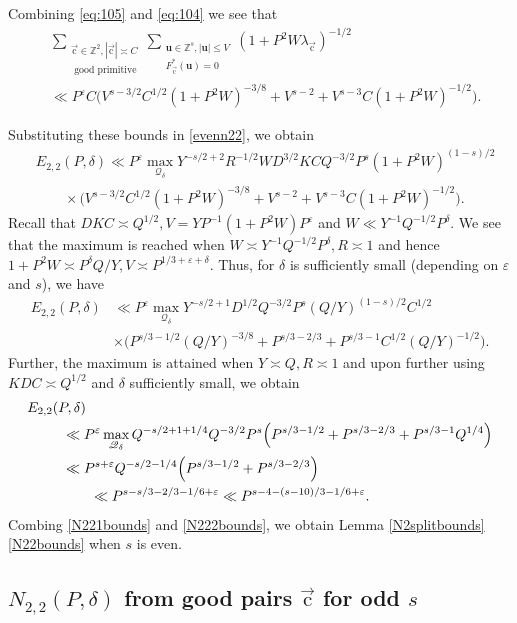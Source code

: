 \documentclass[letterpaper,11pt]{amsart}
\numberwithin{equation}{section}
\theoremstyle{definition}
\numberwithin{equation}{section}
\newcommand{\Z}{\mathbb{Z}}
\newcommand{\ZZ}{\mathbb{Z}}
\newcommand{\uu}{\mathbf{u}}
\newcommand{\uc}{{\vec{\mathrm{c}}}}
\newcommand{\ve}{\varepsilon}
\begin{document}
Combining \eqref{eq:105} and \eqref{eq:104} we see that 
\begin{align*}%
&\sum_{\substack{ \uc\in\ZZ^2, |\uc| \asymp C\\ \textrm{ good primitive}}}			 \sum_{\substack{\uu\in \Z^s, |\uu|\leq V\\ F_\uc^*(\uu)= 0}}(1+P^2W\lambda_\uc)^{-1/2}\\&\ll P^{\ve}C \Big(V^{s-3/2}C^{1/2}(1+P^2W)^{-3/8}+V^{s-2}+V^{s-3}C(1+P^2W)^{-1/2}\Big).
\end{align*}

Substituting these bounds in \eqref{evenn22}, we obtain 
\begin{align*}
&E_{2,2}(P, \delta)\ll P^{\ve}\max_{\mathcal Q_\delta} Y^{-s/2+2}R^{-1/2}WD^{3/2}KCQ^{-3/2}P^{s}(1+P^2W)^{(1-s)/2}\\
&\quad \quad \times \Big(V^{s-3/2}C^{1/2}(1+P^2W)^{-3/8}+V^{s-2}+V^{s-3}C(1+P^2W)^{-1/2}\Big).
\end{align*}
Recall that $DKC\asymp Q^{1/2}, V=YP^{-1} (1+P^2W)P^\ve$ and $W\ll Y^{-1}Q^{-1/2}P^\delta$.  We see that the maximum is reached when $W\asymp Y^{-1}Q^{-1/2}P^\delta, R\asymp 1$ and hence $1+P^2W\asymp P^\delta Q/Y, V\asymp P^{1/3+\ve+\delta}$. Thus, for $\delta$ is sufficiently small (depending on $\ve$ and $s$), we have
\begin{align*}
     E_{2,2}(P, \delta)&\ll P^{\ve}\max_{\mathcal Q_\delta} Y^{-s/2+1}D^{1/2}Q^{-3/2}P^{s}(Q/Y)^{(1-s)/2}C^{1/2}\\
&\times \Big(P^{s/3-1/2}(Q/Y)^{-3/8}+P^{s/3-2/3}+P^{s/3-1}C^{1/2}(Q/Y)^{-1/2}\Big).
\end{align*}
 Further, the maximum is attained when $Y\asymp Q, R\asymp 1$
and upon further using $KDC\asymp Q^{1/2}$ and $\delta$ sufficiently small, we obtain
\begin{align}\nonumber
\MoveEqLeft[2.5] E_{2,2}(P, \delta)\\
\nonumber
&\ll P^\ve\max_{\mathcal Q_\delta} Q^{-s/2+1+1/4}Q^{-3/2}P^{s}
\Big(P^{s/3-1/2}+P^{s/3-2/3}+P^{s/3-1}Q^{1/4}\Big)\\
\nonumber
&\ll
P^{s+\ve} Q^{-s/2-1/4}\Big(P^{s/3-1/2}+P^{s/3-2/3}\Big)
\\
&\qquad\ll P^{s-s/3-2/3-1/6+\ve}\ll  P^{s-4-(s-10)/3-1/6+\ve}.\label{N222bounds}
\end{align}
Combing \eqref{N221bounds} and \eqref{N222bounds}, we obtain Lemma \ref{N2splitbounds}\eqref{N22bounds} when $s$ is even. 


\subsection{$N_{2,2}(P, \delta)$ from good pairs \texorpdfstring{$\uc$}{c} for odd \texorpdfstring{$s$}{s}}\label{sec:good-pairs-GLH}
\end{document}
